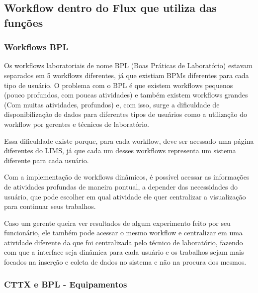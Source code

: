 \subsection{Workflow dentro do Flux que utiliza das funções}

\subsubsection{Workflows BPL}

Os workflows laboratoriais de nome BPL (Boas Práticas de Laboratório) estavam separados em 5 workflows diferentes, já que existiam BPMs diferentes para cada tipo de usuário.
O problema com o BPL é que existem workflows pequenos (pouco profundos, com poucas atividades) e também existem workflows grandes (Com muitas atividades, profundos) e, com isso, surge a dificuldade de disponibilização de dados para diferentes tipos de usuários como a utilização do workflow por gerentes e técnicos de laboratório.

Essa dificuldade existe porque, para cada workflow, deve ser acessado uma página diferentes do LIMS, já que cada um desses workflows representa um sistema diferente para cada usuário.

Com a implementação de workflows dinâmicos, é possível acessar as informações de atividades profundas de maneira pontual, a depender das necessidades do usuário, que pode escolher em qual atividade ele quer centralizar a visualização para continuar seus trabalhos.

Caso um gerente queira ver resultados de algum experimento feito por seu funcionário, ele também pode acessar o mesmo workflow e centralizar em uma atividade diferente da que foi centralizada pelo técnico de laboratório, fazendo com que a interface seja dinâmica para cada usuário e os trabalhos sejam mais focados na inserção e coleta de dados no sistema e não na procura dos mesmos.


\subsubsection{CTTX e BPL - Equipamentos}

